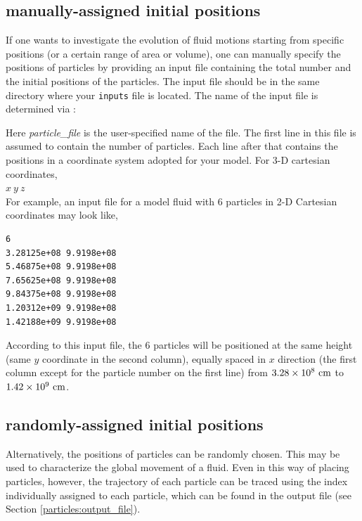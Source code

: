 \subsection{manually-assigned initial positions}
	\label{particle:manualplacement}
If one wants to investigate the evolution of fluid motions starting from specific positions (or a certain range of area or volume), one can manually specify the positions of particles by providing an input file containing the total number and the initial positions of the particles.  
The input file should be in the same directory where your {\tt inputs} file is located. The name of the input file is  determined via :

\vspace{0.1in}
\vspace{0.1in}

\noindent Here {\em particle\_file} is the user-specified name of the file. The first line in this file is
assumed to contain the number of particles.  Each line after that contains the positions in a coordinate system adopted for your model. For 3-D cartesian coordinates, \\

$x ~y ~z$ \\

For example, an input file for a model fluid with 6 particles in 2-D Cartesian coordinates may look like,\\

\begin{lstlisting}
6
3.28125e+08 9.9198e+08 
5.46875e+08 9.9198e+08 
7.65625e+08 9.9198e+08 
9.84375e+08 9.9198e+08 
1.20312e+09 9.9198e+08 
1.42188e+09 9.9198e+08 
\end{lstlisting}

According to this input file, the 6 particles will be positioned at the same height (same $y$ coordinate in the second column), equally spaced in $x$ direction (the first column except for the particle number on the first line) from $3.28\times10^{8} {\rm ~cm}$ to $1.42\times 10^{9} {\rm ~cm}$.
	
\subsection{randomly-assigned initial positions}
\label{particle:randomplacement}
Alternatively, the positions of particles can be randomly chosen. This may be used to characterize the global movement of a fluid. Even in this way of placing particles, however, the trajectory of each particle can be traced using the index individually assigned to each particle, which can be found in the output file (see Section \ref{particles:output_file}).

